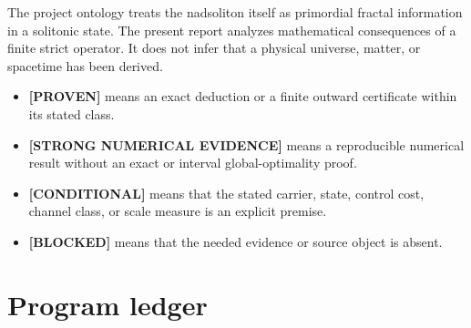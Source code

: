 \documentclass[11pt,a4paper]{article}
\newcommand{\Proven}{\textcolor{proved}{\textbf{[PROVEN]}}}
\newcommand{\Evidence}{\textcolor{conditional}{\textbf{[STRONG NUMERICAL EVIDENCE]}}}
\newcommand{\Conditional}{\textcolor{conditional}{\textbf{[CONDITIONAL]}}}
\newcommand{\Blocked}{\textcolor{blocked}{\textbf{[BLOCKED]}}}
\begin{document}
The project ontology treats the nadsoliton itself as primordial fractal information in a
solitonic state. The present report analyzes mathematical consequences of a finite strict
operator. It does not infer that a physical universe, matter, or spacetime has been derived.

\begin{itemize}
\item \Proven{} means an exact deduction or a finite outward certificate within its stated
class.
\item \Evidence{} means a reproducible numerical result without an exact or interval
global-optimality proof.
\item \Conditional{} means that the stated carrier, state, control cost, channel class, or
scale measure is an explicit premise.
\item \Blocked{} means that the needed evidence or source object is absent.
\end{itemize}

\section{Program ledger}
\end{document}
